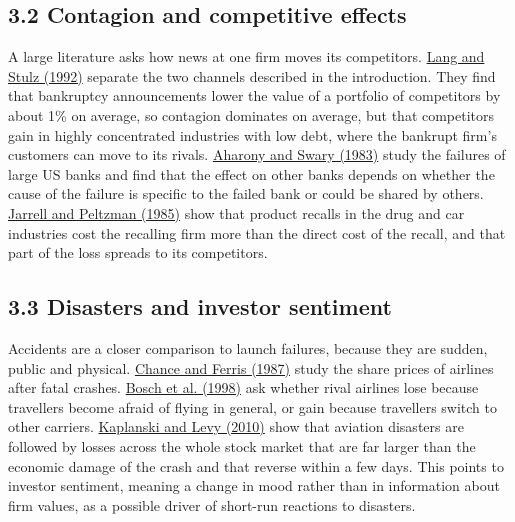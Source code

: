 \documentclass[12pt,a4paper]{article}
\begin{document}
\subsection*{3.2 Contagion and competitive effects}
A large literature asks how news at one firm moves its competitors. \hyperlink{ref-lang1992}{Lang and Stulz (1992)} separate the two channels described in the introduction. They find that bankruptcy announcements lower the value of a portfolio of competitors by about 1\% on average, so contagion dominates on average, but that competitors gain in highly concentrated industries with low debt, where the bankrupt firm's customers can move to its rivals. \hyperlink{ref-aharony1983}{Aharony and Swary (1983)} study the failures of large US banks and find that the effect on other banks depends on whether the cause of the failure is specific to the failed bank or could be shared by others. \hyperlink{ref-jarrell1985}{Jarrell and Peltzman (1985)} show that product recalls in the drug and car industries cost the recalling firm more than the direct cost of the recall, and that part of the loss spreads to its competitors.

\subsection*{3.3 Disasters and investor sentiment}
Accidents are a closer comparison to launch failures, because they are sudden, public and physical. \hyperlink{ref-chance1987}{Chance and Ferris (1987)} study the share prices of airlines after fatal crashes. \hyperlink{ref-bosch1998}{Bosch et al. (1998)} ask whether rival airlines lose because travellers become afraid of flying in general, or gain because travellers switch to other carriers. \hyperlink{ref-kaplanski2010}{Kaplanski and Levy (2010)} show that aviation disasters are followed by losses across the whole stock market that are far larger than the economic damage of the crash and that reverse within a few days. This points to investor sentiment, meaning a change in mood rather than in information about firm values, as a possible driver of short-run reactions to disasters.
\end{document}
